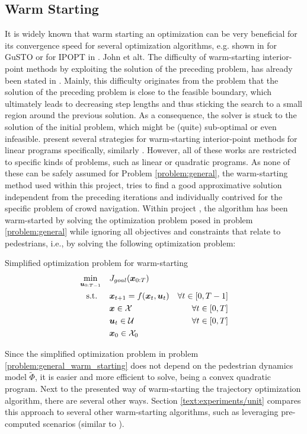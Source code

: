 \subsection{Warm Starting}
\label{text:approach/runtime/warm_starting}
It is widely known that warm starting an optimization can be very beneficial for its convergence speed for several optimization algorithms, e.g. shown in \cite{Banerjee2020} for \ac{GuSTO} or for \ac{IPOPT} in \cite{Spielberg2019}. John et alt. The difficulty of warm-starting interior-point methods by exploiting the solution of the preceding problem, has already been stated in \cite{Wright1997}\cite{Gondzio2008}. Mainly, this difficulty originates from the problem that the solution of the preceding problem is close to the feasible boundary, which ultimately leads to decreasing step lengths and thus sticking the search to a small region around the previous solution. As a consequence, the solver is stuck to the solution of the initial problem, which might be (quite) sub-optimal or even infeasible. \cite{John2008} present several strategies for warm-starting interior-point methods for linear programs specifically, similarly \cite{Shahzad2010}\cite{Gondzio2008}. However, all of these works are restricted to specific kinds of problems, such as linear or quadratic programs. As none of these can be safely assumed for Problem \ref{problem:general}, the warm-starting method used within this project, tries to find a good approximative solution independent from the preceding iterations and individually contrived for the specific problem of crowd navigation.
\newline
Within project \project, the algorithm has been warm-started by solving the optimization problem posed in problem \ref{problem:general} while ignoring all objectives and constraints that relate to pedestrians, i.e., by solving the following optimization problem: \\

\begin{problem}{Simplified optimization problem for warm-starting}
\begin{align}
\min_{\boldsymbol{u}_{0:T-1}} \quad & J_{goal}(\boldsymbol{x}_{0:T}) \\
\textrm{s.t. } \quad & \boldsymbol{x}_{t+1} = f(\boldsymbol{x}_t, \boldsymbol{u}_t) & \forall t \in [0, T - 1] \\
& \boldsymbol{x} \in \mathcal{X} & \forall t \in [0, T]\\
& \boldsymbol{u}_t \in \mathcal{U} & \forall t \in [0, T]\\
& \boldsymbol{x}_0 \in \mathcal{X}_0
\end{align}
\label{problem:general_warm_starting}
\end{problem}

Since the simplified optimization problem in problem \ref{problem:general_warm_starting} does not depend on the pedestrian dynamics model $\tilde{\Phi}$, it is easier and more efficient to solve, being a convex quadratic program. Next to the presented way of warm-starting the trajectory optimization algorithm, there are several other ways. Section \ref{text:experiments/unit} compares this approach to several other warm-starting algorithms, such as leveraging pre-computed scenarios (similar to \cite{Merkt2018}).